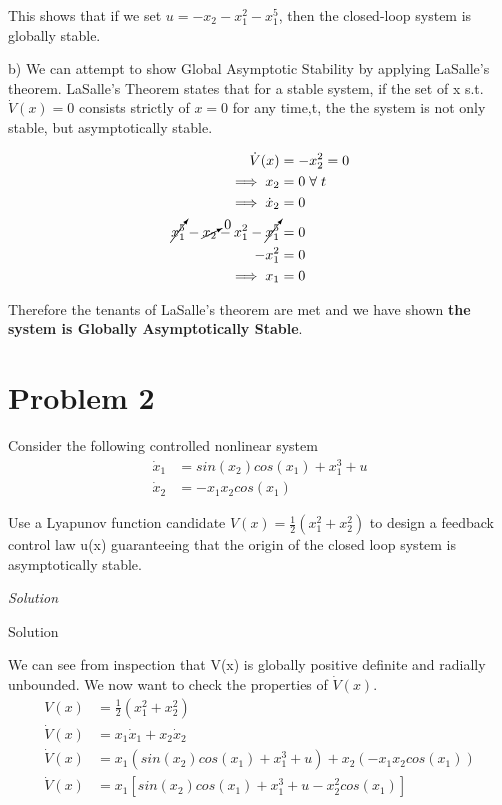 \documentclass{article}
\begin{document}
  This shows that if we set $u=-x_2-x_1^2-x_1^5$, then the closed-loop system is
  globally stable. \newpage
      
  b)
  We can attempt to show Global Asymptotic Stability by applying LaSalle's
  theorem. LaSalle's Theorem states that for a stable system, if the set of
  x s.t. $\dot{V}(x)=0$ consists strictly of $x=0$ for any time,t, the the system is not only
  stable, but asymptotically stable. \newline

  \begin{align*}
    \dot{V}(x) &= -x_2^2 = 0 \\
    \implies x_2 &= 0 \hspace{1mm} \forall \hspace{1mm} t \\
    \implies \dot{x}_2 &= 0 \\
    \cancelto{}{x_1^5} - \cancelto{0}{x_2} - x_1^2 - \cancelto{}{x_1^5} &= 0 \\
    -x_1^2 &= 0 \\
    \implies x_1 &= 0
  \end{align*}

  Therefore the tenants of LaSalle's theorem are met and we have shown
  \textbf{the system is Globally Asymptotically Stable}. \newpage

  
  \section{Problem 2}

  Consider the following controlled nonlinear system
  \begin{align*}
    \dot{x}_1 &= sin(x_2)cos(x_1) + x_1^3 + u \\
    \dot{x}_2 &= -x_1x_2cos(x_1)
  \end{align*}

  Use a Lyapunov function candidate $V(x)=\frac{1}{2}(x_1^2 + x_2^2)$ to design
  a feedback control law u(x) guaranteeing that the origin of the closed loop
  system is asymptotically stable. \newline \newline

  \noindent \textit{Solution} \newline \newline

  Solution
  
  We can see from inspection that V(x) is globally positive definite and
  radially unbounded. We now want to check the properties of $\dot{V}(x)$. 
  \begin{align*}
    V(x) &= \frac{1}{2}(x_1^2+x_2^2) \\
    \dot{V}(x) &= x_1\dot{x}_1 + x_2\dot{x}_2 \\
    \dot{V}(x) &= x_1(sin(x_2)cos(x_1) + x_1^3 + u) + x_2(-x_1x_2cos(x_1)) \\
    \dot{V}(x) &= x_1[sin(x_2)cos(x_1) + x_1^3 + u - x_2^2cos(x_1)]
  \end{align*}
\end{document}
